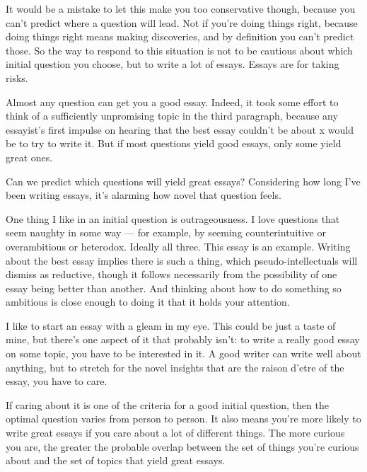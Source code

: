 It would be a mistake to let this
                  make you too conservative though, because you can't predict
                  where a question will lead. Not if you're doing things right,
                  because doing things right means making discoveries, and by
                  definition you can't predict those. So the way to respond to
                  this situation is not to be cautious about which initial
                  question you choose, but to write a lot of essays. Essays are
                  for taking risks.

Almost any question can get you a
                  good essay. Indeed, it took some effort to think of a
                  sufficiently unpromising topic in the third paragraph, because
                  any essayist's first impulse on hearing that the best essay
                  couldn't be about x would be to try to write it. But if most
                  questions yield good essays, only some yield great ones.

Can
                  we predict which questions will yield great essays?
                  Considering how long I've been writing essays, it's alarming
                  how novel that question feels.

One thing I like in
                  an initial question is outrageousness. I love questions that
                  seem naughty in some way --- for example, by seeming
                  counterintuitive or overambitious or heterodox. Ideally all
                  three. This essay is an example. Writing about the best essay
                  implies there is such a thing, which pseudo-intellectuals will
                  dismiss as reductive, though it follows necessarily from the
                  possibility of one essay being better than another. And
                  thinking about how to do something so ambitious is close
                  enough to doing it that it holds your attention.

I
                  like to start an essay with a gleam in my eye. This could be
                  just a taste of mine, but there's one aspect of it that
                  probably isn't: to write a really good essay on some topic,
                  you have to be interested in it. A good writer can write well
                  about anything, but to stretch for the novel insights that are
                  the raison d'etre of the essay, you have to care.

If
                  caring about it is one of the criteria for a good initial
                  question, then the optimal question varies from person to
                  person. It also means you're more likely to write great essays
                  if you care about a lot of different things. The more curious
                  you are, the greater the probable overlap between the set of
                  things you're curious about and the set of topics that yield
                  great essays.

